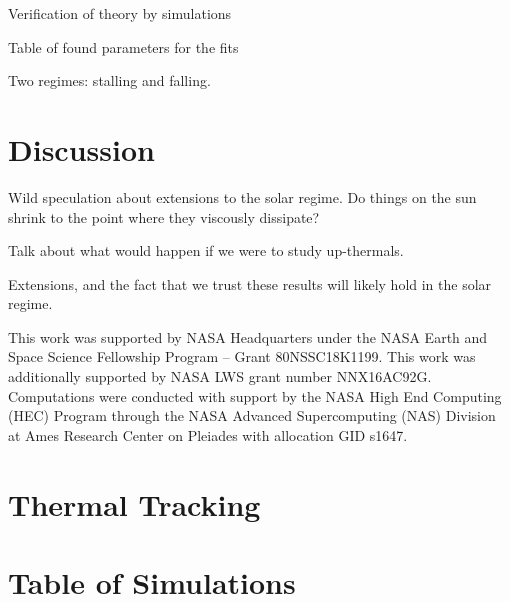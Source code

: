 \documentclass[twocolumn, amsmath, amsfonts, amssymb, trackchanges]{aastex62}
\begin{document}
Verification of theory by simulations

Table of found parameters for the fits

Two regimes: stalling and falling.


\section{Discussion}
\label{sec:discussion}
Wild speculation about extensions to the solar regime. Do things on the sun shrink
to the point where they viscously dissipate?

Talk about what would happen if we were to study up-thermals.

Extensions, and the fact that we trust these results will likely hold in the solar regime.



\begin{acknowledgements}
This work was supported by NASA Headquarters under the NASA Earth and Space
Science Fellowship Program -- Grant 80NSSC18K1199.
This work was additionally supported by  NASA LWS grant number NNX16AC92G.  
Computations were conducted 
with support by the NASA High End Computing (HEC) Program through the NASA 
Advanced Supercomputing (NAS) Division at Ames Research Center on Pleiades
with allocation GID s1647.
\end{acknowledgements}

\appendix
\section{Thermal Tracking}
\label{appendix:tracking}

\section{Table of Simulations}
\label{appendix:table}
\end{document}
